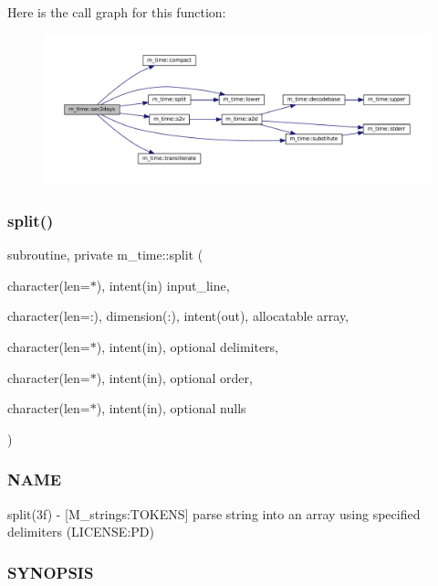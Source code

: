 Here is the call graph for this function\+:\nopagebreak
\begin{figure}[H]
\begin{center}
\leavevmode
\includegraphics[width=350pt]{namespacem__time_a7788285d79b8d58323b05e9a30a2d992_cgraph}
\end{center}
\end{figure}
\mbox{\label{namespacem__time_a16627f5dab7e40434531eed45cb3ea26}} 
\subsubsection{\texorpdfstring{split()}{split()}}
{\footnotesize\ttfamily subroutine, private m\+\_\+time\+::split (\begin{DoxyParamCaption}\item[{character(len=$\ast$), intent(in)}]{input\+\_\+line,  }\item[{character(len=\+:), dimension(\+:), intent(out), allocatable}]{array,  }\item[{character(len=$\ast$), intent(in), optional}]{delimiters,  }\item[{character(len=$\ast$), intent(in), optional}]{order,  }\item[{character(len=$\ast$), intent(in), optional}]{nulls }\end{DoxyParamCaption})\hspace{0.3cm}{\ttfamily [private]}}



\subsubsection*{N\+A\+ME}

split(3f) -\/ \mbox{[}M\+\_\+strings\+:T\+O\+K\+E\+NS\mbox{]} parse string into an array using specified delimiters (L\+I\+C\+E\+N\+SE\+:PD) 

\subsubsection*{S\+Y\+N\+O\+P\+S\+IS}

